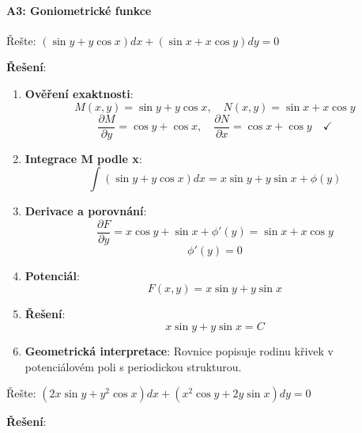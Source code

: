 \paragraph*{A3: Goniometrické funkce}

\begin{example}
Řešte: $(\sin y + y\cos x)dx + (\sin x + x\cos y)dy = 0$
\vspace{0.3\baselineskip}

\textbf{Řešení}: 
\begin{enumerate}
\item \textbf{Ověření exaktnosti}:
\[
M(x, y) = \sin y + y\cos x, \quad N(x, y) = \sin x + x\cos y
\]
\[
\frac{\partial M}{\partial y} = \cos y + \cos x, \quad \frac{\partial N}{\partial x} = \cos x + \cos y \quad \checkmark
\]

\item \textbf{Integrace M podle x}:
\[
\int (\sin y + y\cos x)dx = x\sin y + y\sin x + \phi(y)
\]

\item \textbf{Derivace a porovnání}:
\[
\frac{\partial F}{\partial y} = x\cos y + \sin x + \phi'(y) = \sin x + x\cos y
\]
\[
\phi'(y) = 0
\]

\item \textbf{Potenciál}:
\[
F(x, y) = x\sin y + y\sin x
\]

\item \textbf{Řešení}:
\[
x\sin y + y\sin x = C
\]

\item \textbf{Geometrická interpretace}: Rovnice popisuje rodinu křivek v potenciálovém poli s periodickou strukturou.
\end{enumerate}
\end{example}

\vspace{0.6\baselineskip}

\begin{example}
Řešte: $(2x\sin y + y^2\cos x)dx + (x^2\cos y + 2y\sin x)dy = 0$
\vspace{0.3\baselineskip}

\textbf{Řešení}: 
\end{example}

